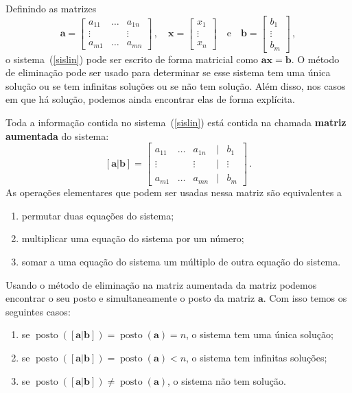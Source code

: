 \documentclass[12pt,a4paper]{report}
\newcommand{\mb}{\mathbf}
\DeclareMathOperator{\posto}{posto}
\begin{document}
Definindo as matrizes
$$\mb a=\begin{bmatrix}
  a_{11}&\ldots&a_{1n}\\
  \vdots&&\vdots\\
  a_{m1}&\ldots&a_{mn}
\end{bmatrix}\,,\quad \mb x=\begin{bmatrix}
  x_1\\
  \vdots\\
  x_n
\end{bmatrix}\quad \text{e}\quad \mb b=\begin{bmatrix}
  b_1\\
  \vdots\\
  b_m
\end{bmatrix}\,,$$
o sistema~(\ref{sislin}) pode ser escrito de forma matricial como $\mb a\mb x=\mb b$. O método de eliminação pode ser usado para determinar se esse sistema tem uma única solução ou se tem infinitas soluções ou se não tem solução. Além disso, nos casos em que há solução, podemos ainda encontrar elas de forma explícita.

Toda a informação contida no sistema~(\ref{sislin}) está contida na chamada \textbf{matriz aumentada} do sistema:
$$[\mb a|\mb b]=\begin{bmatrix}
  a_{11}&\ldots&a_{1n}&|&b_1\\
  \vdots&&\vdots&|&\vdots\\
  a_{m1}&\ldots&a_{mn}&|&b_m
\end{bmatrix}\,.$$
As operações elementares que podem ser usadas nessa matriz são equivalentes a
\begin{enumerate}
  \item permutar duas equações do sistema;
  \item multiplicar uma equação do sistema por um número;
  \item somar a uma equação do sistema um múltiplo de outra equação do sistema.
\end{enumerate}
Usando o método de eliminação na matriz aumentada da matriz podemos encontrar o seu posto e simultaneamente o posto da matriz $\mb a$. Com isso temos os seguintes casos:
\begin{enumerate}
  \item se $\posto([\mb a|\mb b])=\posto(\mb a)=n$, o sistema tem uma única solução;
  \item se $\posto([\mb a|\mb b])=\posto(\mb a)<n$, o sistema tem infinitas soluções;
  \item se $\posto([\mb a|\mb b])\ne\posto(\mb a)$, o sistema não tem solução.
\end{enumerate}
\end{document}
